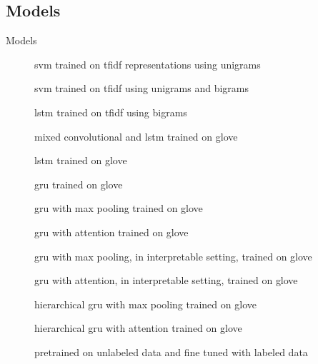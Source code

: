 \subsection{Models}
\begin{frame}{Models}
  \begin{description}
  \item[\svm] \alert{\acs{svm}} trained on \alert{\acs{tfidf}} representations using \alert{unigrams}
  \item[\svmb] \alert{\acs{svm}} trained on \alert{\acs{tfidf}} using \alert{unigrams} and \alert{bigrams}
  \item[\lstmng] \alert{\acs{lstm}} trained on \alert{\acs{tfidf}} using
    \alert{bigrams}
  \item[\lstmc] mixed \alert{convolutional} and \alert{\ac{lstm}} trained on
    \alert{\acs{glove}}
  \item[\lstmb] \alert{\acs{lstm}} trained on \alert{\acs{glove}}
  \item[\gru] \alert{\acs{gru}} trained on \alert{\acs{glove}}
  \item[\maxp] \alert{\acs{gru}} with \alert{max} pooling trained on \alert{\acs{glove}}
  \item[\softmax] \alert{\acs{gru}} with \alert{attention} trained on \alert{\acs{glove}}
  \item[\maxi] \alert{\acs{gru}} with \alert{max} pooling, in \alert{interpretable} setting, trained on \alert{\acs{glove}}
  \item[\softmaxi] \alert{\acs{gru}} with \alert{attention}, in \alert{interpretable} setting, trained on \alert{\acs{glove}}
  \item[\maxh] \alert{hierarchical \acs{gru}} with \alert{max} pooling trained on \alert{\acs{glove}}
  \item[\softmaxh] \alert{hierarchical \acs{gru}} with \alert{attention} trained on \alert{\acs{glove}}
  \item[\bert] \alert{pretrained} on unlabeled data and \alert{fine tuned} with labeled data
  \end{description}
\end{frame}

